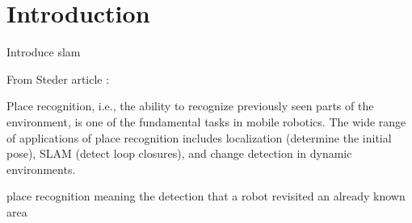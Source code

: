 \section{Introduction}
\label{sec:chap_slam_intro}

Introduce \gls*{slam}


From Steder article : 

Place recognition, i.e., the ability to recognize previously seen parts of the environment, is one of the fundamental tasks in mobile robotics. The wide range of applications of place recognition includes localization (determine the initial pose), SLAM (detect loop closures), and change detection in dynamic environments.

place recognition meaning the detection that a robot revisited an already known area
